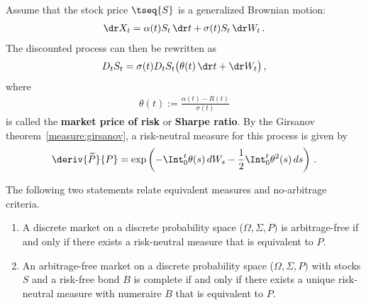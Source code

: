     \begin{example}
        Assume that the stock price $\tseq{S}$ is a generalized Brownian motion:
        \begin{gather}
            \dr X_t = \alpha(t)S_t\,\dr t + \sigma(t)S_t\,\dr W_t\,.
        \end{gather}
        The discounted process can then be rewritten as
        \begin{gather}
            D_tS_t = \sigma(t)D_tS_t\bigl(\theta(t)\,\dr t + \dr W_t\bigr)\,,
        \end{gather}
        where
        \begin{gather}
            \theta(t) := \frac{\alpha(t) - R(t)}{\sigma(t)}
        \end{gather}
        is called the \textbf{market price of risk} or \textbf{Sharpe ratio}. By the Girsanov theorem~\ref{measure:girsanov}, a risk-neutral measure for this process is given by
        \begin{gather}
            \deriv{\widetilde{P}}{P} = \exp\left(-\Int_0^t\theta(s)\,dW_s - \frac{1}{2}\Int_0^t\theta^2(s)\,ds\right)\,.
        \end{gather}
    \end{example}

    \begin{theorem}
        The following two statements relate equivalent measures and no-arbitrage criteria.
        \begin{enumerate}
            \item A discrete market on a discrete probability space ($\Omega,\Sigma,P)$ is arbitrage-free if and only if there exists a risk-neutral measure that is equivalent to $P$.
            \item An arbitrage-free market on a discrete probability space ($\Omega,\Sigma,P)$ with stocks $S$ and a risk-free bond $B$ is complete if and only if there exists a unique risk-neutral measure with numeraire $B$ that is equivalent to $P$.
        \end{enumerate}
    \end{theorem}

    \begin{theorem}
        
    \end{theorem}
